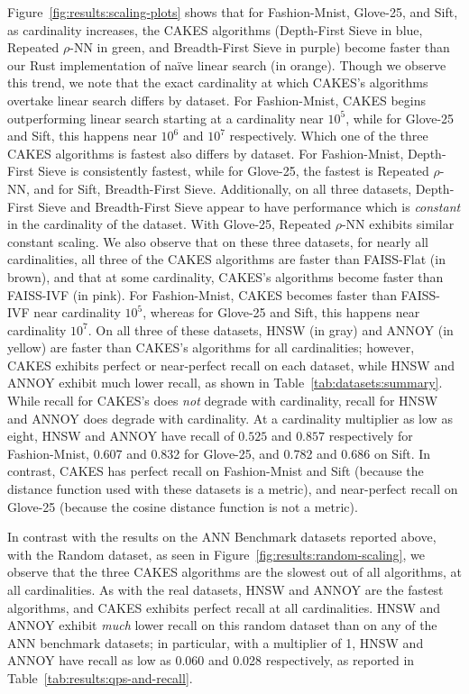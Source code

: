 Figure~\ref{fig:results:scaling-plots} shows that for Fashion-Mnist, Glove-25, and Sift, as cardinality increases, the CAKES algorithms (Depth-First Sieve in blue, Repeated $\rho$-NN in green, and Breadth-First Sieve in purple) become faster than our Rust implementation of na\"{i}ve linear search (in orange).
Though we observe this trend, we note that the exact cardinality at which CAKES's algorithms overtake linear search differs by dataset. For Fashion-Mnist, CAKES begins outperforming linear search starting at a cardinality near $10^5$, while for Glove-25 and Sift, this happens near $10^6$ and $10^7$ respectively. 
Which one of the three CAKES algorithms is fastest also differs by dataset.
For Fashion-Mnist, Depth-First Sieve is consistently fastest, while for Glove-25, the fastest is Repeated $\rho$-NN, and for Sift, Breadth-First Sieve. 
Additionally, on all three datasets, Depth-First Sieve and Breadth-First Sieve appear to have performance which is \textit{constant} in the cardinality of the dataset. 
With Glove-25, Repeated $\rho$-NN exhibits similar constant scaling. 
We also observe that on these three datasets, for nearly all cardinalities, all three of the CAKES algorithms are faster than FAISS-Flat (in brown), and that at some cardinality, CAKES's algorithms become faster than FAISS-IVF (in pink). 
For Fashion-Mnist, CAKES becomes faster than FAISS-IVF near cardinality $10^5$, whereas for Glove-25 and Sift, this happens near cardinality $10^7$. 
On all three of these datasets, HNSW (in gray) and ANNOY (in yellow) are faster than CAKES's algorithms for all cardinalities; however, CAKES exhibits perfect or near-perfect recall on each dataset, while HNSW and ANNOY exhibit much lower recall, as shown in Table~\ref{tab:datasets:summary}.
While recall for CAKES's does \emph{not} degrade with cardinality, recall for HNSW and ANNOY does degrade with cardinality. 
At a cardinality multiplier as low as eight, HNSW and ANNOY have recall of $0.525$ and $0.857$ respectively for Fashion-Mnist, 0.607 and 0.832 for Glove-25, and 0.782 and 0.686 on Sift. 
In contrast, CAKES has perfect recall on Fashion-Mnist and Sift (because the distance function used with these datasets is a metric), and near-perfect recall on Glove-25 (because the cosine distance function is not a metric).


In contrast with the results on the ANN Benchmark datasets reported above, with the Random dataset, as seen in Figure~\ref{fig:results:random-scaling}, we observe that the three CAKES algorithms are the slowest out of all algorithms, at all cardinalities.
As with the real datasets, HNSW and ANNOY are the fastest algorithms, and CAKES exhibits perfect recall at all cardinalities.
HNSW and ANNOY exhibit \textit{much} lower recall on this random dataset than on any of the ANN benchmark datasets;
in particular, with a multiplier of 1, HNSW and ANNOY have recall as low as 0.060 and 0.028 respectively, as reported in Table~\ref{tab:results:qps-and-recall}.

